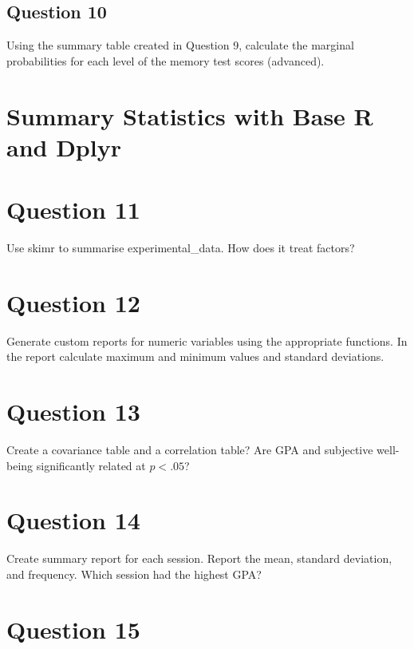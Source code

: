 \documentclass[]{book}
\theoremstyle{definition}
\theoremstyle{definition}
\theoremstyle{definition}
\theoremstyle{remark}
\begin{document}
\hypertarget{question-10}{%
\subsection{Question 10}\label{question-10}}

Using the summary table created in Question 9, calculate the marginal probabilities for each level of the memory test scores (advanced).

\hypertarget{summary-statistics-with-base-r-and-dplyr}{%
\section{Summary Statistics with Base R and Dplyr}\label{summary-statistics-with-base-r-and-dplyr}}

\hypertarget{question-11}{%
\section{Question 11}\label{question-11}}

Use skimr to summarise experimental\_data. How does it treat factors?

\hypertarget{question-12}{%
\section{Question 12}\label{question-12}}

Generate custom reports for numeric variables using the appropriate functions. In the report calculate maximum and minimum values and standard deviations.

\hypertarget{question-13}{%
\section{Question 13}\label{question-13}}

Create a covariance table and a correlation table? Are GPA and subjective well-being significantly related at \(p < .05\)?

\hypertarget{question-14}{%
\section{Question 14}\label{question-14}}

Create summary report for each session. Report the mean, standard deviation, and frequency. Which session had the highest GPA?

\hypertarget{question-15}{%
\section{Question 15}\label{question-15}}
\end{document}
